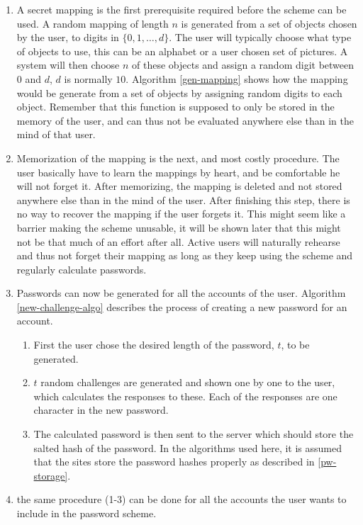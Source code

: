 \begin{enumerate}
    \item A secret mapping is the first prerequisite required before the scheme can be used. A random mapping of length $n$ is generated from a set of objects chosen by the user, to digits in $\{0,1,\dots,d\}$. The user will typically choose what type of objects to use, this can be an alphabet or a user chosen set of pictures. A system will then choose $n$ of these objects and assign a random digit between $0$ and $d$, $d$ is normally $10$. Algorithm \ref{gen-mapping} shows how the mapping would be generate from a set of objects by assigning random digits to each object. Remember that this function is supposed to only be stored in the memory of the user, and can thus not be evaluated anywhere else than in the mind of that user.
    \item Memorization of the mapping is the next, and most costly procedure. The user basically have to learn the mappings by heart, and be comfortable he will not forget it. After memorizing, the mapping is deleted and not stored anywhere else than in the mind of the user. After finishing this step, there is no way to recover the mapping if the user forgets it. This might seem like a barrier making the scheme unusable, it will be shown later that this might not be that much of an effort after all. Active users will naturally rehearse and thus not forget their mapping as long as they keep using the scheme and regularly calculate passwords.
    \item Passwords can now be generated for all the accounts of the user. Algorithm \ref{new-challenge-algo} describes the process of creating a new password for an account. 
    \begin{enumerate}
        \item First the user chose the desired length of the password, $t$, to be generated. 
        \item $t$ random challenges are generated and shown one by one to the user, which calculates the responses to these. Each of the responses are one character in the new password. 
        \item The calculated password is then sent to the server which should store the salted hash of the password. In the algorithms used here, it is assumed that the sites store the password hashes properly as described in \autoref{pw-storage}. 
    \end{enumerate}
    \item the same procedure (1-3) can be done for all the accounts the user wants to include in the password scheme.
\end{enumerate}

